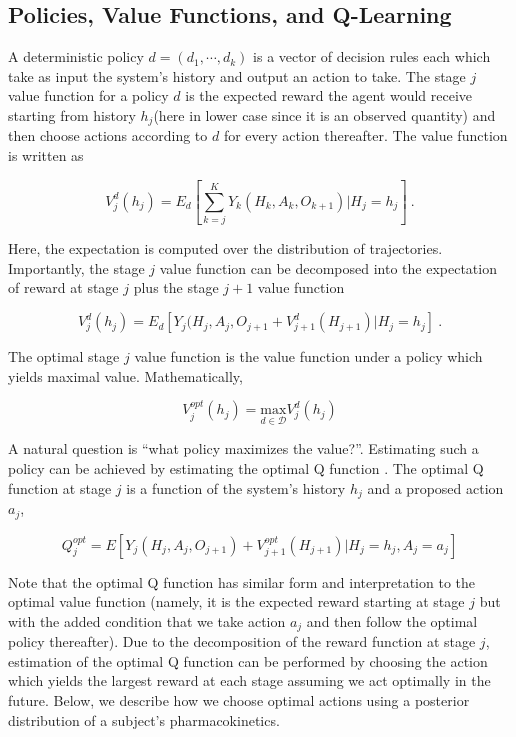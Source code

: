 \subsection{Policies, Value Functions, and Q-Learning}

A deterministic policy $ d = (d_1, \cdots, d_k) $ is a vector of decision rules each which take as input the system’s history and output an action to take. The stage $ j $ value function for a policy $ d $ is the expected reward the agent would receive starting from history $ h_j  $(here in lower case since it is an observed quantity) and then choose actions according to $ d $ for every action thereafter.  The value function is written as

\begin{equation}
	V^d_j(h_j) = E_d\left[ \sum_{k=j}^K Y_k(H_k, A_k, O_{k+1}) \Bigg\lvert H_j = h_j\right] \>.
\end{equation}

\noindent Here, the expectation is computed over the distribution of trajectories. Importantly, the stage $ j $ 
value function can be decomposed into the expectation of reward at stage $ j $ plus the stage $ j+1  $ value function  \cite{chakraborty2013statistical}

\begin{equation}
V^d_j(h_j) = E_d\left[Y_j(H_j, A_j, O_{j+1} + V^d_{j+1}(H_{j+1}) \vert H_j = h_j\right] \>.
\end{equation}


\noindent The optimal stage $ j  $ value function is the value function under a policy which yields maximal value.  Mathematically, 

\begin{equation}
V^{opt}_j(h_j) = \underset{d \in \mathscr{D}}{\mbox{max}} V^d_j(h_j)
\end{equation}

\noindent A natural question is “what policy maximizes the value?”. Estimating such a policy can be achieved by estimating the optimal Q function \cite{chakraborty2013statistical}.  The optimal Q function at stage $ j $ is a function of the system’s history $ h_j $ and a proposed action $ a_j $,

\begin{equation}
 Q_j^{opt} = E \left[ 
 Y_j(H_j, A_j, O_{j+1}) + V^{opt}_{j+1}(H_{j+1}) \lvert H_j = h_j, A_j = a_j
 \right]
\end{equation}

Note that the optimal Q function has similar form and interpretation to the optimal value function (namely, it is the expected reward starting at stage $ j $ but with the added condition that we take action $ a_j $ and then follow the optimal policy thereafter). Due to the decomposition of the reward function at stage $ j $, estimation of the optimal Q function can be performed by choosing the action which yields the largest reward at each stage assuming we act optimally in the future.  Below, we describe how we choose optimal actions using a posterior distribution of a subject’s pharmacokinetics.

